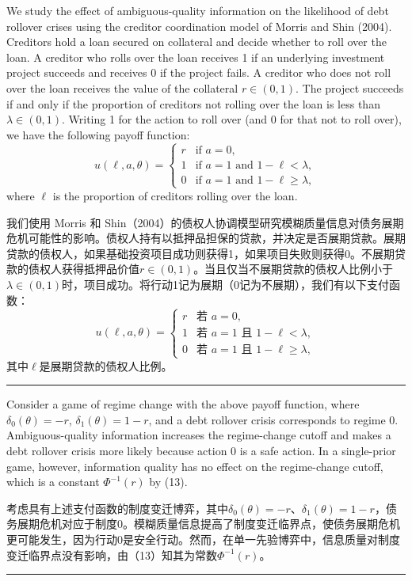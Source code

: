 \documentclass[12pt,a4paper]{article}
\newenvironment{original}
  {\par\medskip\noindent\color{black}\ignorespaces}
  {\par\medskip}
\newenvironment{translation}
  {\par\noindent\color{darkblue}\ignorespaces}
  {\par\medskip\noindent\hrule\par\medskip}
\theoremstyle{definition}
\theoremstyle{remark}
\begin{document}
\begin{original}
We study the effect of ambiguous-quality information on the likelihood of debt rollover crises using the creditor coordination model of Morris and Shin (2004). Creditors hold a loan secured on collateral and decide whether to roll over the loan. A creditor who rolls over the loan receives 1 if an underlying investment project succeeds and receives 0 if the project fails. A creditor who does not roll over the loan receives the value of the collateral $r \in (0, 1)$. The project succeeds if and only if the proportion of creditors not rolling over the loan is less than $\lambda \in (0, 1)$. Writing 1 for the action to roll over (and 0 for that not to roll over), we have the following payoff function:
\[
u(\ell, a, \theta) =
\begin{cases}
r & \text{if } a = 0,\\
1 & \text{if } a = 1 \text{ and } 1 - \ell < \lambda,\\
0 & \text{if } a = 1 \text{ and } 1 - \ell \ge \lambda,
\end{cases}
\]
where $\ell$ is the proportion of creditors rolling over the loan.
\end{original}
\begin{translation}
我们使用 Morris 和 Shin（2004）的债权人协调模型研究模糊质量信息对债务展期危机可能性的影响。债权人持有以抵押品担保的贷款，并决定是否展期贷款。展期贷款的债权人，如果基础投资项目成功则获得1，如果项目失败则获得0。不展期贷款的债权人获得抵押品价值$r \in (0, 1)$。当且仅当不展期贷款的债权人比例小于$\lambda \in (0, 1)$时，项目成功。将行动1记为展期（0记为不展期），我们有以下支付函数：
\[
u(\ell, a, \theta) =
\begin{cases}
r & \text{若 } a = 0,\\
1 & \text{若 } a = 1 \text{ 且 } 1 - \ell < \lambda,\\
0 & \text{若 } a = 1 \text{ 且 } 1 - \ell \ge \lambda,
\end{cases}
\]
其中$\ell$是展期贷款的债权人比例。
\end{translation}

\begin{original}
Consider a game of regime change with the above payoff function, where $\delta_0(\theta) = -r$, $\delta_1(\theta) = 1 - r$, and a debt rollover crisis corresponds to regime 0. Ambiguous-quality information increases the regime-change cutoff and makes a debt rollover crisis more likely because action 0 is a safe action. In a single-prior game, however, information quality has no effect on the regime-change cutoff, which is a constant $\Phi^{-1}(r)$ by (13).
\end{original}
\begin{translation}
考虑具有上述支付函数的制度变迁博弈，其中$\delta_0(\theta) = -r$、$\delta_1(\theta) = 1 - r$，债务展期危机对应于制度0。模糊质量信息提高了制度变迁临界点，使债务展期危机更可能发生，因为行动0是安全行动。然而，在单一先验博弈中，信息质量对制度变迁临界点没有影响，由（13）知其为常数$\Phi^{-1}(r)$。
\end{translation}
\end{document}

